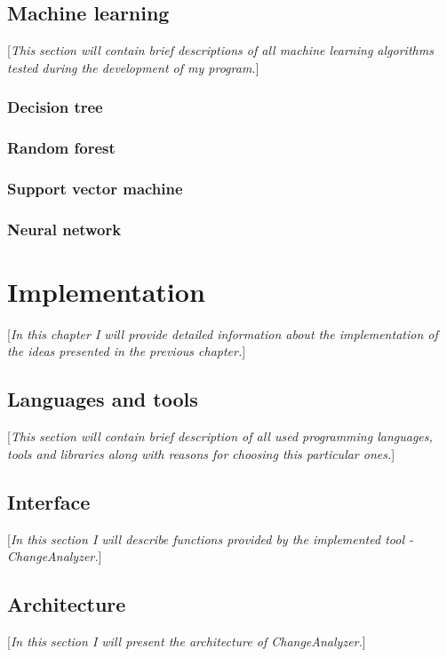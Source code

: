 \documentclass{pracamgr}
\begin{document}
\section{Machine learning}
\label{sec:machine_learning}
[\textit{This section will contain brief descriptions of all machine learning algorithms tested during the development of my program.}]

\subsection{Decision tree}
\label{sec:decision_tree}

\subsection{Random forest}
\label{sec:random_forest}

\subsection{Support vector machine}
\label{sec:svm}

\subsection{Neural network}
\label{sec:neural_net}

\chapter{Implementation}
\label{cha:implementation}
[\textit{In this chapter I will provide detailed information about the implementation of the ideas presented in the previous chapter.}]

\section{Languages and tools}
\label{sec:languagess}
[\textit{This section will contain brief description of all used programming languages, tools and libraries along with reasons for choosing this particular ones.}]

\section{Interface}
\label{sec:interface}
[\textit{In this section I will describe functions provided by the implemented tool - ChangeAnalyzer.}]

\section{Architecture}
\label{sec:architecture}
[\textit{In this section I will present the architecture of ChangeAnalyzer.}]
\end{document}
